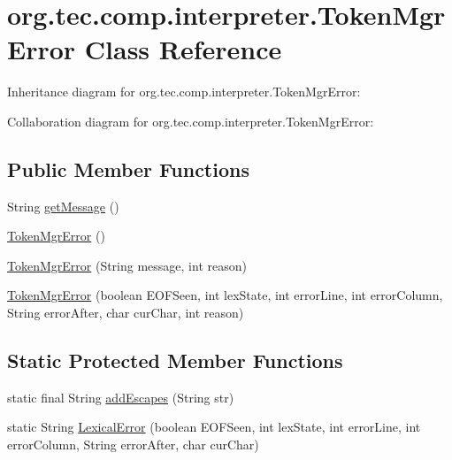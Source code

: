 \hypertarget{classorg_1_1tec_1_1comp_1_1interpreter_1_1_token_mgr_error}{}\section{org.\+tec.\+comp.\+interpreter.\+Token\+Mgr\+Error Class Reference}
\label{classorg_1_1tec_1_1comp_1_1interpreter_1_1_token_mgr_error}


Inheritance diagram for org.\+tec.\+comp.\+interpreter.\+Token\+Mgr\+Error\+:


Collaboration diagram for org.\+tec.\+comp.\+interpreter.\+Token\+Mgr\+Error\+:
\subsection*{Public Member Functions}
\begin{DoxyCompactItemize}
\item 
String \mbox{\hyperlink{classorg_1_1tec_1_1comp_1_1interpreter_1_1_token_mgr_error_a5c97cd3354418ad50461590b436a3cf7}{get\+Message}} ()
\item 
\mbox{\hyperlink{classorg_1_1tec_1_1comp_1_1interpreter_1_1_token_mgr_error_a447ef4031345c8904d47e0d8cf07cb1c}{Token\+Mgr\+Error}} ()
\item 
\mbox{\hyperlink{classorg_1_1tec_1_1comp_1_1interpreter_1_1_token_mgr_error_ac0cc052c49b6626c5807957f8255bce8}{Token\+Mgr\+Error}} (String message, int reason)
\item 
\mbox{\hyperlink{classorg_1_1tec_1_1comp_1_1interpreter_1_1_token_mgr_error_aa9f9ecd18a7ee03fa802afc194350684}{Token\+Mgr\+Error}} (boolean E\+O\+F\+Seen, int lex\+State, int error\+Line, int error\+Column, String error\+After, char cur\+Char, int reason)
\end{DoxyCompactItemize}
\subsection*{Static Protected Member Functions}
\begin{DoxyCompactItemize}
\item 
static final String \mbox{\hyperlink{classorg_1_1tec_1_1comp_1_1interpreter_1_1_token_mgr_error_a4a588812077302158a19c74bb6bb41c2}{add\+Escapes}} (String str)
\item 
static String \mbox{\hyperlink{classorg_1_1tec_1_1comp_1_1interpreter_1_1_token_mgr_error_a37270639947dc5a998abcf8031b121f2}{Lexical\+Error}} (boolean E\+O\+F\+Seen, int lex\+State, int error\+Line, int error\+Column, String error\+After, char cur\+Char)
\end{DoxyCompactItemize}


